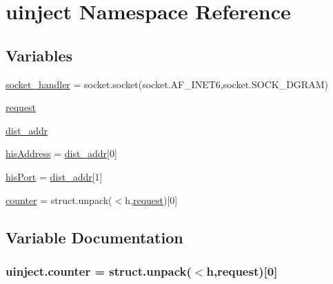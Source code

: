 \hypertarget{namespaceuinject}{}\section{uinject Namespace Reference}
\label{namespaceuinject}
\subsection*{Variables}
\begin{DoxyCompactItemize}
\item 
\hyperlink{namespaceuinject_abb3235eb6e3db601d83d70f41fafef29}{socket\+\_\+handler} = socket.\+socket(socket.\+A\+F\+\_\+\+I\+N\+E\+T6,socket.\+S\+O\+C\+K\+\_\+\+D\+G\+R\+AM)
\item 
\hyperlink{namespaceuinject_a022c3828ea6e0f0bb9807bfd2e77f860}{request}
\item 
\hyperlink{namespaceuinject_abe27d8465cd7ce3b80936a3096ac8b07}{dist\+\_\+addr}
\item 
\hyperlink{namespaceuinject_a4888af3336122d0451c4c4e3097b885b}{his\+Address} = \hyperlink{namespaceuinject_abe27d8465cd7ce3b80936a3096ac8b07}{dist\+\_\+addr}\mbox{[}0\mbox{]}
\item 
\hyperlink{namespaceuinject_ac5af8e5ca5cbe6592430915ec11a6156}{his\+Port} = \hyperlink{namespaceuinject_abe27d8465cd7ce3b80936a3096ac8b07}{dist\+\_\+addr}\mbox{[}1\mbox{]}
\item 
\hyperlink{namespaceuinject_aeb7bf1345a167fb65b37fd00797d6d1b}{counter} = struct.\+unpack(\textquotesingle{}$<$h\textquotesingle{},\hyperlink{namespaceuinject_a022c3828ea6e0f0bb9807bfd2e77f860}{request})\mbox{[}0\mbox{]}
\end{DoxyCompactItemize}


\subsection{Variable Documentation}
\subsubsection[{\texorpdfstring{counter}{counter}}]{\setlength{\rightskip}{0pt plus 5cm}uinject.\+counter = struct.\+unpack(\textquotesingle{}$<$h\textquotesingle{},{\bf request})\mbox{[}0\mbox{]}}\hypertarget{namespaceuinject_aeb7bf1345a167fb65b37fd00797d6d1b}{}\label{namespaceuinject_aeb7bf1345a167fb65b37fd00797d6d1b}


